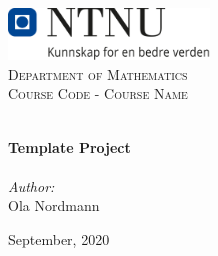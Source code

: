
\begin{titlepage}
\vbox{ }
\vbox{ }
\begin{center}
\includegraphics[width=0.40\textwidth]{Images/NTNU_logo.png}\\[1cm]
\textsc{\LARGE Department of Mathematics}\\[1.5cm]
\textsc{\Large Course Code - Course Name}\\[0.5cm]
\vbox{ }

\HRule \\[0.4cm]
{ \huge \bfseries Template Project}\\[0.4cm]
\HRule \\[1.5cm]

\large
\emph{Author:}\\
Ola Nordmann
\vfill

{\large September, 2020}
\end{center}
\end{titlepage}